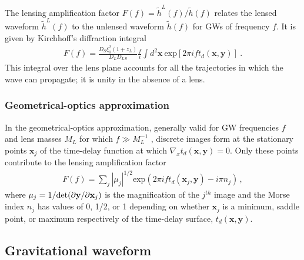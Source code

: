 \documentclass[floats,floatfix,showpacs,amssymb,prd,twocolumn,superscriptaddress,nofootinbib,nolongbibliography,reprint]{revtex4-2}
\renewcommand{\vec}[1]{\mathbf{#1}}
\begin{document}
The lensing amplification factor $F(f) = \tilde{h}^L(f)/\tilde{h}(f)$ relates the lensed waveform $\tilde{h}^L(f)$ to the unlensed waveform $\tilde{h}(f)$ for GWs of frequency $f$.  It is given by Kirchhoff's diffraction integral \cite{1992grle.book.....S,Takahashi_2003}
\begin{align}\label{eq:amplification factor}
    F(f) = \frac{D_S \xi^2_0 (1+z_L)}{D_L D_{LS}} \frac{f}{i} \int d^2 \vec{x}~ \text{exp}{[2 \pi i f t_d(\boldsymbol{x}, \boldsymbol{y})]}~.
\end{align}
This integral over the lens plane accounts for all the trajectories in which the wave can propagate; it is unity in the absence of a lens.

\subsubsection{\label{subsec: geometrical optics approximation} Geometrical-optics approximation}

In the geometrical-optics approximation, generally valid for GW frequencies $f$ and lens masses $M_L$ for which $f \gg M_L^{-1}$ \cite{Takahashi_2004}, discrete images form at the stationary points $\vec{x}_j$ of the time-delay function at which $\nabla_x t_d(\vec{x}, \vec{y}) = 0$.  Only these points contribute to the lensing amplification factor
\begin{align}\label{eq:amplification factor geo}
    F(f) = \sum_j |\mu_j|^{1/2} \text{exp}\left(2 \pi i f t_d({\vec{x}_j, \vec{y}}) - i \pi n_j \right)\,,
\end{align}
where $\mu_j = 1/{\rm det}(\partial\vec{y}/\partial\vec{x}_j)$ is the magnification of the $j^{th}$ image and the Morse index $n_j$ has values of 0, 1/2, or 1 depending on whether $\vec{x}_j$ is a minimum, saddle point, or maximum respectively of the time-delay surface, $t_d(\vec{x}, \vec{y})$. 

\subsection{\label{subsec:gravitational waveform} Gravitational waveform}
\end{document}
